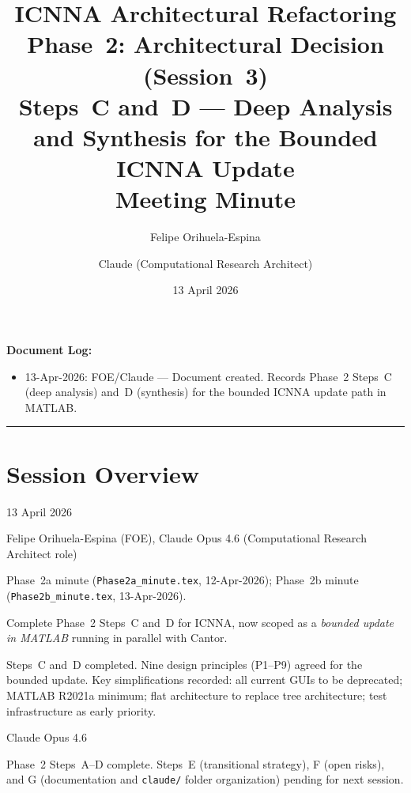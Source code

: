 \documentclass[11pt,a4paper]{article}
\title{ICNNA Architectural Refactoring\\Phase~2: Architectural Decision (Session~3)\\
\large Steps~C and~D --- Deep Analysis and Synthesis for the Bounded ICNNA Update\\
Meeting Minute}
\author{Felipe Orihuela-Espina \and Claude (Computational Research Architect)}
\date{13 April 2026}
\begin{document}
\maketitle

\noindent\textbf{Document Log:}
\begin{itemize}[nosep]
    \item 13-Apr-2026: FOE/Claude --- Document created. Records Phase~2 Steps~C (deep analysis) and~D (synthesis) for the bounded ICNNA update path in MATLAB.
\end{itemize}

\vspace{1em}
\hrule
\vspace{1em}

\section{Session Overview}

\begin{description}[style=nextline]
    \item[Date:] 13 April 2026
    \item[Participants:] Felipe Orihuela-Espina (FOE), Claude Opus 4.6 (Computational Research Architect role)
    \item[Predecessors:] Phase~2a minute (\texttt{Phase2a\_minute.tex}, 12-Apr-2026); Phase~2b minute (\texttt{Phase2b\_minute.tex}, 13-Apr-2026).
    \item[Objective:] Complete Phase~2 Steps~C and~D for ICNNA, now scoped as a \emph{bounded update in MATLAB} running in parallel with Cantor.
    \item[Outcome:] Steps~C and~D completed. Nine design principles (P1--P9) agreed for the bounded update. Key simplifications recorded: all current GUIs to be deprecated; MATLAB R2021a minimum; flat architecture to replace tree architecture; test infrastructure as early priority.
    \item[Model used:] Claude Opus 4.6
    \item[Status:] Phase~2 Steps~A--D complete. Steps~E (transitional strategy), F (open risks), and G (documentation and \texttt{claude/} folder organization) pending for next session.
\end{description}

\end{document}
